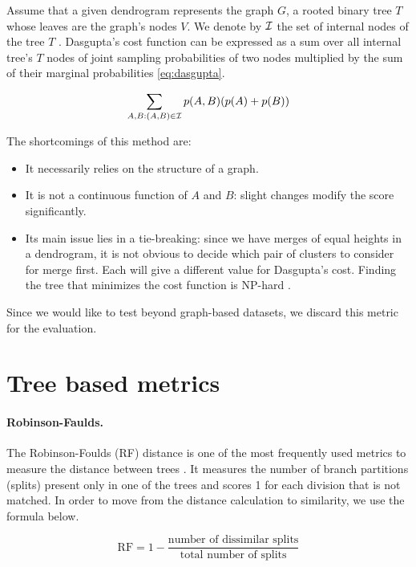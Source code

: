 Assume that a given dendrogram represents the graph $G$, a rooted binary tree $T$ whose leaves are the graph's nodes $V$. We denote by ${\cal I}$ the set of internal nodes of the tree $T$ \cite{Bonald2018a}. 
Dasgupta's cost function can be expressed as a sum over all internal tree's $T$ nodes of joint sampling probabilities of two nodes multiplied by the sum of their marginal probabilities \ref{eq:dasgupta}. 

\begin{equation}
\label{eq:dasgupta}
\sum_{A,B: (A,B) \in {\cal I}}p(A,B)(p(A) + p(B)) 
\end{equation}

The shortcomings of this method are:
\begin{itemize}
	\item It necessarily relies on the structure of a graph.
	\item It is not a continuous function of $A$ and $B$: slight changes modify the score significantly.
	\item Its main issue lies in a tie-breaking: since we have merges of equal heights in a dendrogram, it is not obvious to decide which pair of clusters to consider for merge first. Each will give a different value for Dasgupta's cost. Finding the tree that minimizes the cost function is NP-hard \cite{dasgupta2016cost}.
\end{itemize}

Since we would like to test beyond graph-based datasets, we discard this metric for the evaluation.

\section{Tree based metrics}
\paragraph{Robinson-Faulds.} \label{RF_metric}
The Robinson-Foulds (RF) distance is one of the most frequently used metrics to measure the distance between trees \cite{ROBINSON}. It measures the number of branch partitions (splits) present only in one of the trees and scores 1 for each division that is not matched. In order to move from the distance calculation to similarity, we use the formula below. 


$$\text{RF} = 1 - \frac{\text{number of dissimilar splits}}{\text{total number of splits}}$$

